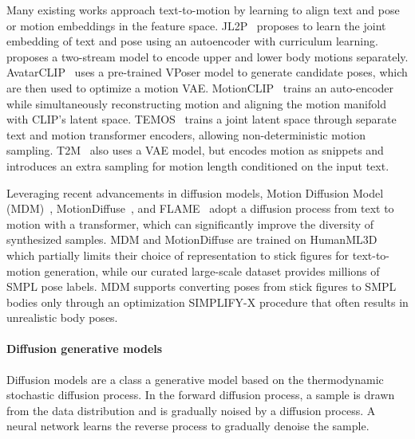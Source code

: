 \documentclass[10pt,twocolumn,letterpaper]{article}
\begin{document}
 Many existing works approach text-to-motion by learning to align text and pose or motion embeddings in the feature space. JL2P~\cite{ahuja2019jl2p} proposes to learn the joint embedding of text and pose using an autoencoder with curriculum learning. \cite{ghosh2021} proposes a two-stream model to encode upper and lower body motions separately. AvatarCLIP~\cite{hong2022avatarclip} uses a pre-trained VPoser model to generate candidate poses, which are then used to optimize a motion VAE. MotionCLIP~\cite{tevet2022motionclip} trains an auto-encoder while simultaneously reconstructing motion and aligning the motion manifold with CLIP's latent space. TEMOS~\cite{petrovich2022temos} trains a joint latent space through separate text and motion transformer encoders, allowing non-deterministic motion sampling. T2M~\cite{guo2022t2m} also uses a VAE model, but encodes motion as snippets and introduces an extra sampling for motion length conditioned on the input text.

Leveraging recent advancements in diffusion models, Motion Diffusion Model (MDM)~\cite{tevet2022mdm}, MotionDiffuse~\cite{zhang2022md}, and FLAME~\cite{kim2022flame} adopt a diffusion process from text to motion with a transformer, which can significantly improve the diversity of synthesized samples. MDM and MotionDiffuse are trained on HumanML3D~\cite{guo2022t2m} which partially limits their choice of representation to stick figures for text-to-motion generation, while our curated large-scale dataset provides millions of SMPL pose labels. MDM supports converting poses from stick figures to SMPL bodies only through an optimization SIMPLIFY-X\cite{simplify-x} procedure that often results in unrealistic body poses. 


\paragraph{Diffusion generative models} 
Diffusion models are a class a generative model based on the thermodynamic stochastic diffusion process. In the forward diffusion process, a sample is drawn from the data distribution and is gradually noised by a diffusion process. A neural network learns the reverse process to gradually denoise the sample. 
\end{document}
